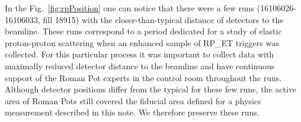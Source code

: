 In the Fig.~\ref{fig:rpPosition} one can notice that there were a few runs (16106026-16106033, fill 18915) with the closer-than-typical distance of detectors to the beamline. These runs correspond to a period dedicated for a study of elastic proton-proton scattering when an enhanced sample of RP\_ET triggers was collected. %
For this particular process it was important to collect data with maximally reduced detector distance to the beamline and have continuous support of the Roman Pot experts in the control room throughout the runs. Although detector positions differ from the typical for these few runs, the active area of Roman Pots still covered the fiducial area defined for a physics measurement described in this note. We therefore preserve these runs. 

